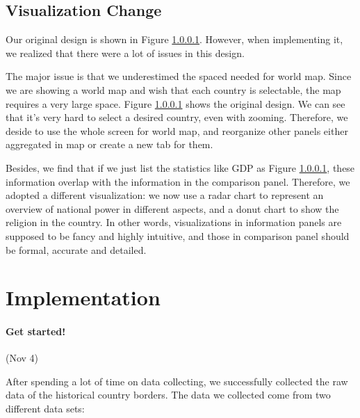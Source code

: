 \documentclass[12pt, fullpage,letterpaper]{article}
\begin{document}
    \subsection{Visualization Change}
        Our original design is shown in Figure \ref{}. However, when implementing it, we realized that there were a lot of issues in this design.

        The major issue is that we underestimed the spaced needed for world map. Since we are showing a world map and wish that
        each country is selectable, the map requires a very large space. Figure \ref{} shows the original design. We can see that it's very hard to select a desired country, even with zooming.
        Therefore, we deside to use the whole screen for world map, and reorganize other panels either aggregated in map or create a new tab for them.

        Besides, we find that if we just list the statistics like GDP as Figure \ref{}, these information overlap with the information in the comparison panel.
        Therefore, we adopted a different visualization: we now use a radar chart to represent an overview of national power in different aspects,
        and a donut chart to show the religion in the country. In other words, visualizations in information panels are supposed to be fancy and highly intuitive,
        and those in comparison panel should be formal, accurate and detailed.
\newpage

\section{Implementation}

\paragraph{Get started!} (Nov 4)

After spending a lot of time on data collecting, we successfully collected
the raw data of the historical country borders. The data we collected come
from two different data sets:
\end{document}
